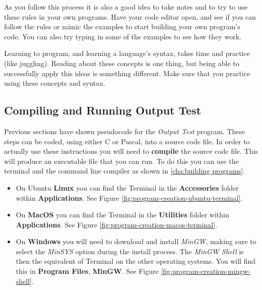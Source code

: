 As you follow this process it is also a good idea to take notes and to try to use these rules in your own programs. Have your code editor open, and see if you can follow the rules or mimic the examples to start building your own program's code. You can also try typing in some of the examples to see how they work.

Learning to program, and learning a language's syntax, takes time and practice (like juggling). Reading about these concepts is one thing, but being able to successfully apply this ideas is something different. Make sure that you practice using these concepts and syntax.



\subsection{Compiling and Running Output Test} %
\label{sub:compiling_and_running_output_test}

Previous sections have shown pseudocode for the \emph{Output Test} program. These steps can be coded, using either C or Pascal, into a source code file. In order to actually use these instructions you will need to \textbf{compile} the source code file. This will produce an executable file that you can run. To do this you can use the terminal and the command line compiler as shown in \cref{cha:building programs}.

\begin{itemize}
  \item On Ubuntu \textbf{Linux} you can find the Terminal in the \textbf{Accessories} folder within \textbf{Applications}. See Figure \ref{fig:program-creation-ubuntu-terminal}.
  \item On \textbf{MacOS} you can find the Terminal in the \textbf{Utilities} folder within \textbf{Applications}. See Figure \ref{fig:program-creation-macos-terminal}.
  \item On \textbf{Windows} you will need to download and install \emph{MinGW}, making sure to select the \emph{MinSYS} option during the install process. The \emph{MinGW Shell} is then the equivalent of Terminal on the other operating systems. You will find this in \textbf{Program Files}, \textbf{MinGW}. See Figure \ref{fig:program-creation-mingw-shell}.
\end{itemize}

